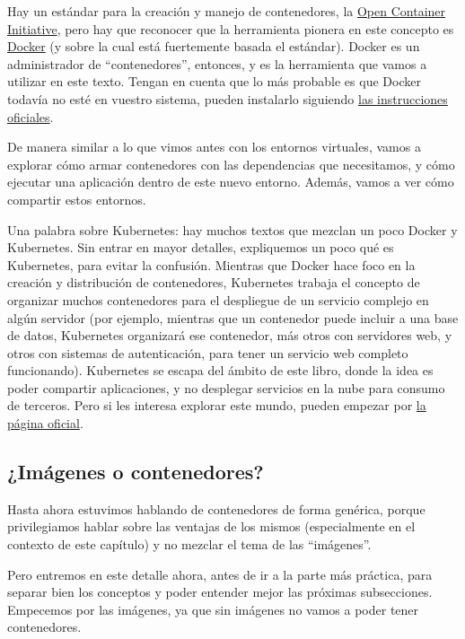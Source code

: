 Hay un estándar para la creación y manejo de contenedores, la \href{https://opencontainers.org/}{Open Container Initiative}, pero hay que reconocer que la herramienta pionera en este concepto es \href{https://www.docker.com/}{Docker} (y sobre la cual está fuertemente basada el estándar). Docker es un administrador de ``contenedores'', entonces, y es la herramienta que vamos a utilizar en este texto. Tengan en cuenta que lo más probable es que Docker todavía no esté en vuestro sistema, pueden instalarlo siguiendo \href{https://docs.docker.com/get-started/#download-and-install-docker}{las instrucciones oficiales}.

De manera similar a lo que vimos antes con los entornos virtuales, vamos a explorar cómo armar contenedores con las dependencias que necesitamos, y cómo ejecutar una aplicación dentro de este nuevo entorno. Además, vamos a ver cómo compartir estos entornos.

Una palabra sobre Kubernetes: hay muchos textos que mezclan un poco Docker y Kubernetes. Sin entrar en mayor detalles, expliquemos un poco qué es Kubernetes, para evitar la confusión. Mientras que Docker hace foco en la creación y distribución de contenedores, Kubernetes trabaja el concepto de organizar muchos contenedores para el despliegue de un servicio complejo en algún servidor (por ejemplo, mientras que un contenedor puede incluir a una base de datos, Kubernetes organizará ese contenedor, más otros con servidores web, y otros con sistemas de autenticación, para tener un servicio web completo funcionando). Kubernetes se escapa del ámbito de este libro, donde la idea es poder compartir aplicaciones, y no desplegar servicios en la nube para consumo de terceros. Pero si les interesa explorar este mundo, pueden empezar por \href{https://kubernetes.io/es/docs/concepts/overview/what-is-kubernetes/}{la página oficial}.


\subsection{¿Imágenes o contenedores?}

Hasta ahora estuvimos hablando de contenedores de forma genérica, porque privilegiamos hablar sobre las ventajas de los mismos (especialmente en el contexto de este capítulo) y no mezclar el tema de las ``imágenes''.

Pero entremos en este detalle ahora, antes de ir a la parte más práctica, para separar bien los conceptos y poder entender mejor las próximas subsecciones. Empecemos por las imágenes, ya que sin imágenes no vamos a poder tener contenedores. 

